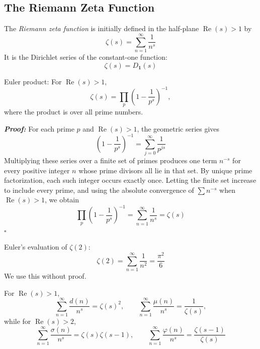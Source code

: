 \documentclass[a4paper,11pt,abstracton]{scrartcl}
\theoremstyle{dotlessP}
\theoremstyle{dotlessS}
\theoremstyle{remark}
\theoremstyle{definition}
\begin{document}
\subsection{The Riemann Zeta Function}
\label{subsec:riemann-zeta}

\begin{definition_box}
The \emph{Riemann zeta function} is initially defined in the half-plane
$\operatorname{Re}(s)>1$ by
\[
    \zeta(s)=\sum_{n=1}^{\infty}\frac1{n^s}
\]
It is the Dirichlet series of the constant-one function:
\[
    \zeta(s)=D_{\mathbf{1}}(s)
\]
\end{definition_box}

\begin{mainbox}{Euler product:}
For $\operatorname{Re}(s)>1$,
\[
    \zeta(s)=\prod_{p}
      \left(1-\frac1{p^s}\right)^{-1},
\]
where the product is over all prime numbers.
\end{mainbox}

\begin{claim_box}
\textbf{\textit{Proof:}}
For each prime $p$ and $\operatorname{Re}(s)>1$, the geometric series
gives
\[
    \left(1-\frac1{p^s}\right)^{-1}
      =\sum_{j=0}^{\infty}\frac1{p^{js}}
\]
Multiplying these series over a finite set of primes produces one term
$n^{-s}$ for every positive integer $n$ whose prime divisors all lie
in that set. By unique prime factorization, each such integer occurs
exactly once. Letting the finite set increase to include every prime,
and using the absolute convergence of $\sum n^{-s}$ when
$\operatorname{Re}(s)>1$, we obtain
\[
    \prod_p\left(1-\frac1{p^s}\right)^{-1}
      =\sum_{n=1}^{\infty}\frac1{n^s}
      =\zeta(s)
\]
\hfill$\square$
\end{claim_box}

\begin{mainbox}{Euler's evaluation of $\zeta(2)$:}
\begin{equation}
\label{eq:zeta-two}
    \zeta(2)=\sum_{n=1}^{\infty}\frac1{n^2}
      =\frac{\pi^2}{6}
\end{equation}
We use this without proof.
\end{mainbox}


\begin{example_box}
For $\operatorname{Re}(s)>1$,
\[
    \sum_{n=1}^{\infty}\frac{d(n)}{n^s}=\zeta(s)^2,
    \qquad
    \sum_{n=1}^{\infty}\frac{\mu(n)}{n^s}=\frac1{\zeta(s)},
\]
while for $\operatorname{Re}(s)>2$,
\[
    \sum_{n=1}^{\infty}\frac{\sigma(n)}{n^s}
      =\zeta(s)\zeta(s-1),
    \qquad
    \sum_{n=1}^{\infty}\frac{\varphi(n)}{n^s}
      =\frac{\zeta(s-1)}{\zeta(s)}
\]
\end{example_box}
\end{document}
